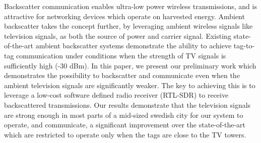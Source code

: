 Backscatter communication enables ultra-low
power wireless transmissions, and is attractive
for networking devices which operate 
on harvested energy. Ambient backscatter
takes the concept further, by leveraging
ambient wireless signals like
television signals, as both the source of power
and carrier signal. Existing state-of-the-art ambient backscatter
systems demonstrate the ability to achieve tag-to-tag communication 
under conditions when the
strength of TV signals is sufficiently high (-30 dBm).  In this paper, we present our preliminary work
which demonstrates the possibility to backscatter and communicate even when the ambient television signals
are significantly weaker. The key to achieving this is to leverage a low-cost
software defined radio receiver (RTL-SDR) to receive backscattered transmissions. Our results 
demonstrate that the  television signals are strong 
enough in most parts of a mid-sized swedish city for our system
to operate, and communicate, a significant improvement over the
state-of-the-art which are
restricted to operate only when the tags are close to the TV towers.
